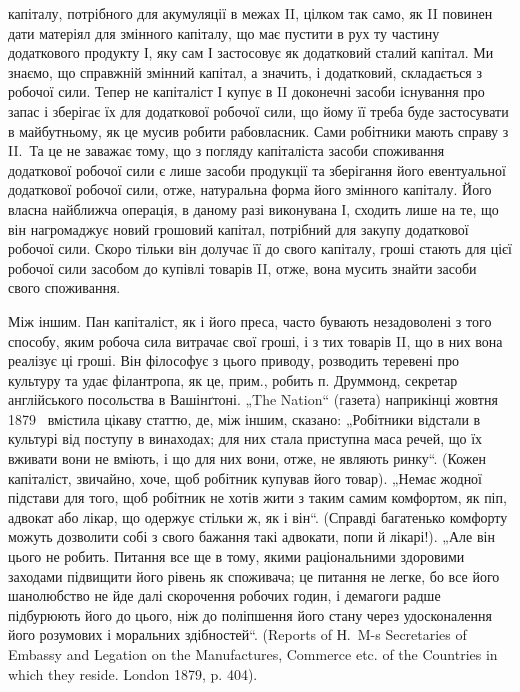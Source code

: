 \parcont{}  %
капіталу, потрібного для акумуляції в межах II, цілком так само, як II
повинен дати матеріял для змінного капіталу, що має пустити в рух ту
частину додаткового продукту І, яку сам І застосовує як додатковий
сталий капітал. Ми знаємо, що справжній змінний капітал, а значить, і
додатковий, складається з робочої сили. Тепер не капіталіст І купує в II
доконечні засоби існування про запас і зберігає їх для додаткової робочої
сили, що йому її треба буде застосувати в майбутньому, як це
мусив робити рабовласник. Сами робітники мають справу з II.~Та це не
заважає тому, що з погляду капіталіста засоби споживання додаткової
робочої сили є лише засоби продукції та зберігання його евентуальної
додаткової робочої сили, отже, натуральна форма його змінного капіталу.
Його власна найближча операція, в даному разі виконувана І, сходить
лише на те, що він нагромаджує новий грошовий капітал, потрібний для
закупу додаткової робочої сили. Скоро тільки він долучає її до свого
капіталу, гроші стають для цієї робочої сили засобом до купівлі
товарів II, отже, вона мусить знайти засоби свого споживання.

Між іншим. Пан капіталіст, як і його преса, часто бувають незадоволені
з того способу, яким робоча сила витрачає свої гроші, і з
тих товарів II, що в них вона реалізує ці гроші. Він філософує з цього
приводу, розводить теревені про культуру та удає філантропа, як це,
прим., робить п. Друммонд, секретар англійського посольства в Вашінґтоні.
„The Nation“ (газета) наприкінці жовтня 1879~ вмістила цікаву
статтю, де, між іншим, сказано: „Робітники відстали в культурі від поступу
в винаходах; для них стала приступна маса речей, що їх вживати
вони не вміють, і що для них вони, отже, не являють ринку“.
(Кожен капіталіст, звичайно, хоче, щоб робітник купував його товар).
„Немає жодної підстави для того, щоб робітник не хотів жити з таким
самим комфортом, як піп, адвокат або лікар, що одержує стільки ж, як
і він“. (Справді багатенько комфорту можуть дозволити собі з свого бажання
такі адвокати, попи й лікарі!). „Але він цього не робить. Питання
все ще в тому, якими раціональними здоровими заходами підвищити його
рівень як споживача; це питання не легке, бо все його шанолюбство не
йде далі скорочення робочих годин, і демагоги радше підбурюють його
до цього, ніж до поліпшення його стану через удосконалення його розумових
і моральних здібностей“. (Reports of Н.~M-s Secretaries of Embassy
and Legation on the Manufactures, Commerce etc. of the Countries in
which they reside. London 1879, p. 404).

